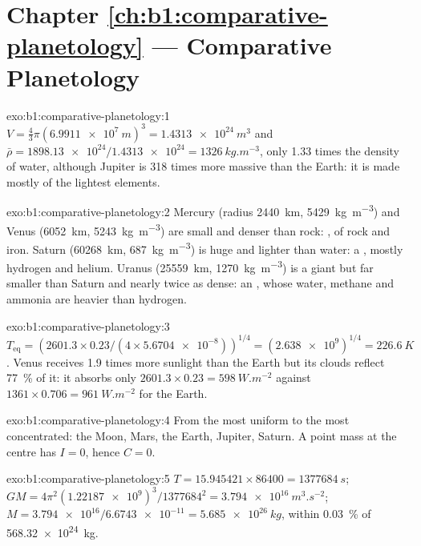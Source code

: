 \section*{Chapter \ref{ch:b1:comparative-planetology} --- Comparative Planetology}

\begin{solution}{exo:b1:comparative-planetology:1}
$V = \tfrac43\pi(\qty{6.9911e7}{m})^3 = \qty{1.4313e24}{m^3}$ and
$\bar\rho = \num{1898.13e24}/\num{1.4313e24} = \qty{1326}{kg.m^{-3}}$, only
1.33 times the density of water, although Jupiter is 318 times more massive
than the Earth: it is made mostly of the lightest elements.
\end{solution}

\begin{solution}{exo:b1:comparative-planetology:2}
Mercury (radius \qty{2440}{km}, \qty{5429}{kg.m^{-3}}) and Venus
(\qty{6052}{km}, \qty{5243}{kg.m^{-3}}) are small and denser than rock:
, of rock and iron. Saturn (\qty{60268}{km},
\qty{687}{kg.m^{-3}}) is huge and lighter than water: a , mostly
hydrogen and helium. Uranus (\qty{25559}{km}, \qty{1270}{kg.m^{-3}}) is a
giant but far smaller than Saturn and nearly twice as dense: an ,
whose water, methane and ammonia are heavier than hydrogen.
\end{solution}

\begin{solution}{exo:b1:comparative-planetology:3}
$T_\mathrm{eq} = (2601.3\times0.23/(4\times\num{5.6704e-8}))^{1/4} =
(\num{2.638e9})^{1/4} = \qty{226.6}{K}$. Venus receives 1.9 times more
sunlight than the Earth but its clouds reflect \qty{77}{\percent} of it:
it absorbs only $2601.3\times0.23 = \qty{598}{W.m^{-2}}$ against
$1361\times0.706 = \qty{961}{W.m^{-2}}$ for the Earth.
\end{solution}

\begin{solution}{exo:b1:comparative-planetology:4}
From the most uniform to the most concentrated: the Moon, Mars, the Earth,
Jupiter, Saturn. A point mass at the centre has $I = 0$, hence $C = 0$.
\end{solution}

\begin{solution}{exo:b1:comparative-planetology:5}
$T = 15.945421\times86400 = \qty{1377684}{s}$;
$GM = 4\pi^2(\num{1.22187e9})^3/\num{1377684}^2 = \qty{3.794e16}{m^3.s^{-2}}$;
$M = \num{3.794e16}/\num{6.6743e-11} = \qty{5.685e26}{kg}$, within
\qty{0.03}{\percent} of \qty{568.32e24}{kg}.
\end{solution}

